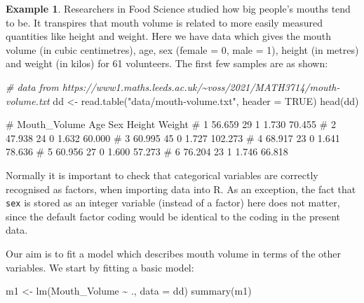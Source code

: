 \documentclass[
  a4paper,
]{article}
\newenvironment{Shaded}{\begin{snugshade}}{\end{snugshade}}
\newcommand{\AttributeTok}[1]{\textcolor[rgb]{0.77,0.63,0.00}{#1}}
\newcommand{\CommentTok}[1]{\textcolor[rgb]{0.56,0.35,0.01}{\textit{#1}}}
\newcommand{\ConstantTok}[1]{\textcolor[rgb]{0.00,0.00,0.00}{#1}}
\newcommand{\FunctionTok}[1]{\textcolor[rgb]{0.00,0.00,0.00}{#1}}
\newcommand{\NormalTok}[1]{#1}
\newcommand{\OtherTok}[1]{\textcolor[rgb]{0.56,0.35,0.01}{#1}}
\newcommand{\SpecialCharTok}[1]{\textcolor[rgb]{0.00,0.00,0.00}{#1}}
\newcommand{\StringTok}[1]{\textcolor[rgb]{0.31,0.60,0.02}{#1}}
\theoremstyle{definition}
\theoremstyle{definition}
\newtheorem{example}{Example}[section]
\theoremstyle{definition}
\theoremstyle{definition}
\theoremstyle{remark}
\begin{document}
\begin{example}
Researchers in Food Science studied how big people's mouths tend to be.
It transpires that mouth volume is related to more easily measured quantities
like height and weight. Here we have data which gives
the mouth volume (in cubic centimetres), age, sex (female = 0, male = 1),
height (in metres) and weight (in kilos) for 61 volunteers.
The first few samples are as shown:

\begin{Shaded}
\begin{Highlighting}[]
\CommentTok{\# data from https://www1.maths.leeds.ac.uk/\textasciitilde{}voss/2021/MATH3714/mouth{-}volume.txt}
\NormalTok{dd }\OtherTok{\textless{}{-}} \FunctionTok{read.table}\NormalTok{(}\StringTok{"data/mouth{-}volume.txt"}\NormalTok{, }\AttributeTok{header =} \ConstantTok{TRUE}\NormalTok{)}
\FunctionTok{head}\NormalTok{(dd)}
\end{Highlighting}
\end{Shaded}

\begin{Shaded}
\begin{Highlighting}[]
\NormalTok{\#   Mouth\_Volume Age Sex Height  Weight}
\NormalTok{\# 1       56.659  29   1  1.730  70.455}
\NormalTok{\# 2       47.938  24   0  1.632  60.000}
\NormalTok{\# 3       60.995  45   0  1.727 102.273}
\NormalTok{\# 4       68.917  23   0  1.641  78.636}
\NormalTok{\# 5       60.956  27   0  1.600  57.273}
\NormalTok{\# 6       76.204  23   1  1.746  66.818}
\end{Highlighting}
\end{Shaded}

Normally it is important to check that categorical variables are correctly
recognised as factors, when importing data into R. As an exception,
the fact that \texttt{sex} is stored as an integer variable (instead of a factor)
here does not matter, since the default factor coding would be identical
to the coding in the present data.

Our aim is to fit a model which describes mouth volume in terms of the
other variables. We start by fitting a basic model:

\begin{Shaded}
\begin{Highlighting}[]
\NormalTok{m1 }\OtherTok{\textless{}{-}} \FunctionTok{lm}\NormalTok{(Mouth\_Volume }\SpecialCharTok{\textasciitilde{}}\NormalTok{ ., }\AttributeTok{data =}\NormalTok{ dd)}
\FunctionTok{summary}\NormalTok{(m1)}
\end{Highlighting}
\end{Shaded}


\end{example}
\end{document}
